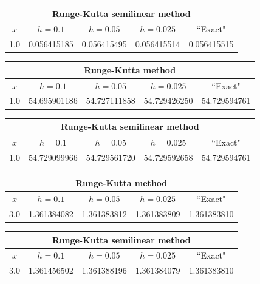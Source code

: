 \hspace{.75in}
{\small
\begin{tabular}{|c|r|r|r|r|}
\hline
\multicolumn{5}{|c|}{
 Runge-Kutta  semilinear method}\\\hline
\multicolumn{1}{|c|}{$x$}&
\multicolumn{1}{|c|}{$h=0.1$}&
\multicolumn{1}{|c|}{$h=0.05$}&
\multicolumn{1}{|c|}{$h=0.025$}&
\multicolumn{1}{|c|}{``Exact"}\\ \hline
1.0 & 0.056415185 & 0.056415495 & 0.056415514 & 0.056415515 \\
\hline
\end{tabular}}\bigskip

{\small
\begin{tabular}{|c|r|r|r|r|}
\hline
\multicolumn{5}{|c|}{Runge-Kutta method}\\\hline
\multicolumn{1}{|c|}{$x$}&
\multicolumn{1}{|c|}{$h=0.1$}&
\multicolumn{1}{|c|}{$h=0.05$}&
\multicolumn{1}{|c|}{$h=0.025$}&
\multicolumn{1}{|c|}{``Exact"}\\ \hline
1.0 & 54.695901186 & 54.727111858 & 54.729426250 & 54.729594761 \\
\hline
\end{tabular}}\bigskip

\hspace{.75in}
{\small
\begin{tabular}{|c|r|r|r|r|}
\hline
\multicolumn{5}{|c|}{Runge-Kutta semilinear method}\\\hline
\multicolumn{1}{|c|}{$x$}&
\multicolumn{1}{|c|}{$h=0.1$}&
\multicolumn{1}{|c|}{$h=0.05$}&
\multicolumn{1}{|c|}{$h=0.025$}&
\multicolumn{1}{|c|}{``Exact"}\\ \hline
1.0 & 54.729099966 & 54.729561720 & 54.729592658 & 54.729594761 \\
\hline
\end{tabular}}\bigskip

{\small
\begin{tabular}{|c|r|r|r|r|}
\hline
\multicolumn{5}{|c|}{Runge-Kutta method}\\\hline
\multicolumn{1}{|c|}{$x$}&
\multicolumn{1}{|c|}{$h=0.1$}&
\multicolumn{1}{|c|}{$h=0.05$}&
\multicolumn{1}{|c|}{$h=0.025$}&
\multicolumn{1}{|c|}{``Exact"}\\ \hline
3.0 & 1.361384082 & 1.361383812 & 1.361383809 & 1.361383810 \\
\hline
\end{tabular}}\bigskip

\hspace{.75in}
{\small
\begin{tabular}{|c|r|r|r|r|}
\hline
\multicolumn{5}{|c|}{Runge-Kutta semilinear method}\\\hline
\multicolumn{1}{|c|}{$x$}&
\multicolumn{1}{|c|}{$h=0.1$}&
\multicolumn{1}{|c|}{$h=0.05$}&
\multicolumn{1}{|c|}{$h=0.025$}&
\multicolumn{1}{|c|}{``Exact"}\\ \hline
3.0 & 1.361456502 & 1.361388196 & 1.361384079 & 1.361383810 \\
\hline
\end{tabular}}\bigskip

